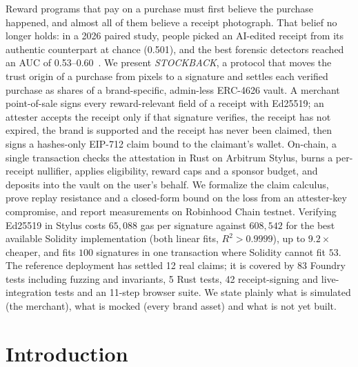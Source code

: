 \documentclass[10.5pt,letterpaper]{article}
\theoremstyle{definition}
\theoremstyle{remark}
\begin{document}
\begin{center}
\begin{minipage}{0.9\textwidth}
\small
{}
Reward programs that pay on a purchase must first believe the purchase happened, and almost all of them
believe a receipt photograph. That belief no longer holds: in a 2026 paired study, people picked an
AI-edited receipt from its authentic counterpart at chance (0.501), and the best forensic detectors reached
an AUC of 0.53--0.60~\cite{wu2026forger}. We present \emph{STOCKBACK}, a protocol that moves the trust origin of a
purchase from pixels to a signature and settles each verified purchase as shares of a brand-specific,
admin-less ERC-4626 vault. A merchant point-of-sale signs every reward-relevant field of a receipt with
Ed25519; an attester accepts the receipt only if that signature verifies, the receipt has not expired, the
brand is supported and the receipt has never been claimed, then signs a hashes-only EIP-712 claim bound to
the claimant's wallet. On-chain, a single transaction checks the attestation in Rust on Arbitrum Stylus,
burns a per-receipt nullifier, applies eligibility, reward caps and a sponsor budget, and deposits into the
vault on the user's behalf. We formalize the claim calculus, prove replay resistance and a closed-form bound
on the loss from an attester-key compromise, and report measurements on Robinhood Chain testnet. Verifying
Ed25519 in Stylus costs $65{,}088$ gas per signature against $608{,}542$ for the best available Solidity
implementation (both linear fits, $R^2>0.9999$), up to $9.2\times$ cheaper, and fits $100$ signatures in one
transaction where Solidity cannot fit $53$. The reference deployment has settled 12 real claims; it is covered
by 83 Foundry tests including fuzzing and invariants, 5 Rust tests, 42 receipt-signing and live-integration
tests and an 11-step browser suite. We state plainly what is simulated (the merchant), what is mocked (every
brand asset) and what is not yet built.
\end{minipage}
\end{center}

\vspace{6pt}

\section{Introduction}
\end{document}
